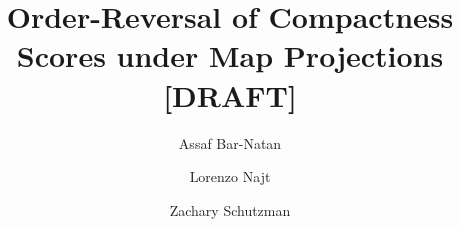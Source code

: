 \documentclass[11pt]{article}
\title{Order-Reversal of Compactness Scores under Map Projections [DRAFT]}
\author{Assaf Bar-Natan \and Lorenzo Najt \and Zachary Schutzman }
\theoremstyle{definition}
\theoremstyle{remark}
\begin{document}
\maketitle
	
\begin{abstract}

\end{abstract}























\pagebreak
\appendix


\end{document}
